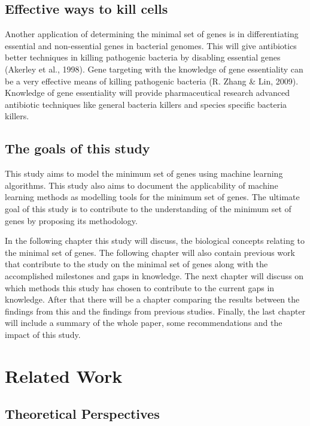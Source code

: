 \documentclass[]{report}
\begin{document}
\section{Effective ways to kill
cells}\label{effective-ways-to-kill-cells}

Another application of determining the minimal set of genes is in
differentiating essential and non-essential genes in bacterial genomes.
This will give antibiotics better techniques in killing pathogenic
bacteria by disabling essential genes (Akerley et al., 1998). Gene
targeting with the knowledge of gene essentiality can be a very
effective means of killing pathogenic bacteria (R. Zhang \& Lin, 2009).
Knowledge of gene essentiality will provide pharmaceutical research
advanced antibiotic techniques like general bacteria killers and species
specific bacteria killers.

\section{The goals of this study}\label{the-goals-of-this-study}

This study aims to model the minimum set of genes using machine learning
algorithms. This study also aims to document the applicability of
machine learning methods as modelling tools for the minimum set of
genes. The ultimate goal of this study is to contribute to the
understanding of the minimum set of genes by proposing its methodology.

In the following chapter this study will discuss, the biological
concepts relating to the minimal set of genes. The following chapter
will also contain previous work that contribute to the study on the
minimal set of genes along with the accomplished milestones and gaps in
knowledge. The next chapter will discuss on which methods this study has
chosen to contribute to the current gaps in knowledge. After that there
will be a chapter comparing the results between the findings from this
and the findings from previous studies. Finally, the last chapter will
include a summary of the whole paper, some recommendations and the
impact of this study.

\chapter{Related Work}\label{related-work}

\section{Theoretical Perspectives}\label{theoretical-perspectives}
\end{document}
